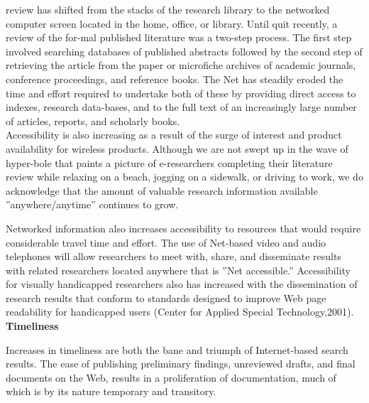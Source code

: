 \documentclass{book}
\begin{document}
\vspace*{0.5cm}
review has shifted from the stacks of the research library to the networked computer screen located in the home, office, or library. Until quit recently, a review of the for-mal published literature was a two-step process. The first step involved searching databases of published abstracts followed by the second step of retrieving the article from the paper or microfiche archives of academic journals, conference proceedings, and reference books. The Net has steadily eroded the time and effort required to undertake both of these by providing direct access to indexes, research data-bases, and to the full text of an increasingly large number of articles, reports, and scholarly books.\\
\hspace*{0.5cm} Accessibility is also increasing as a result of the surge of interest and product availability for wireless products. Although we are not swept up in the wave of hyper-bole that paints a picture of e-researchers completing their literature review while relaxing on a beach, jogging on a sidewalk, or driving to work, we do acknowledge that the amount of valuable research information available ''anywhere/anytime'' continues to grow.


 Networked information also increases accessibility to resources that would require considerable travel time and effort. The use of Net-based video and audio telephones will allow researchers to meet with, share, and disseminate results with related researchers located anywhere that is ''Net accessible.'' Accessibility for visually handicapped researchers also has increased with the dissemination of research results that conform to standards designed to improve Web page readability for handicapped users (Center for Applied Special Technology,2001).\\

\vspace*{0.5cm}
\large{
\textbf{Timeliness}\\
}

\hspace*{0.7cm}Increases in timeliness are both the bane and triumph of Internet-based search results. The ease of publishing preliminary findings, unreviewed drafts, and final documents on the Web, results in a proliferation of documentation, much of which is by its nature temporary and transitory.
\end{document}
